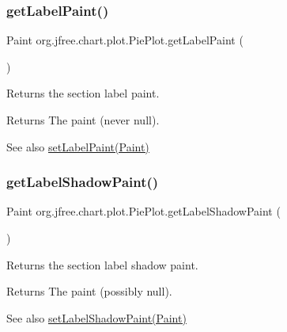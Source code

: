 \subsubsection{\texorpdfstring{get\+Label\+Paint()}{getLabelPaint()}}
{\footnotesize\ttfamily Paint org.\+jfree.\+chart.\+plot.\+Pie\+Plot.\+get\+Label\+Paint (\begin{DoxyParamCaption}{ }\end{DoxyParamCaption})}

Returns the section label paint.

\begin{DoxyReturn}{Returns}
The paint (never {\ttfamily null}).
\end{DoxyReturn}
\begin{DoxySeeAlso}{See also}
\mbox{\hyperlink{classorg_1_1jfree_1_1chart_1_1plot_1_1_pie_plot_a941a98c8b83cf13669906ec888eb4f83}{set\+Label\+Paint(\+Paint)}} 
\end{DoxySeeAlso}
\mbox{\label{classorg_1_1jfree_1_1chart_1_1plot_1_1_pie_plot_a09e7247103d5d1a36b12783c235a574f}} 
\subsubsection{\texorpdfstring{get\+Label\+Shadow\+Paint()}{getLabelShadowPaint()}}
{\footnotesize\ttfamily Paint org.\+jfree.\+chart.\+plot.\+Pie\+Plot.\+get\+Label\+Shadow\+Paint (\begin{DoxyParamCaption}{ }\end{DoxyParamCaption})}

Returns the section label shadow paint.

\begin{DoxyReturn}{Returns}
The paint (possibly {\ttfamily null}).
\end{DoxyReturn}
\begin{DoxySeeAlso}{See also}
\mbox{\hyperlink{classorg_1_1jfree_1_1chart_1_1plot_1_1_pie_plot_aeb9d4d1a5664515d7202816d553613f0}{set\+Label\+Shadow\+Paint(\+Paint)}} 
\end{DoxySeeAlso}
\mbox{\label{classorg_1_1jfree_1_1chart_1_1plot_1_1_pie_plot_a6bb041de79edb3351e574497d83f71cb}} 

